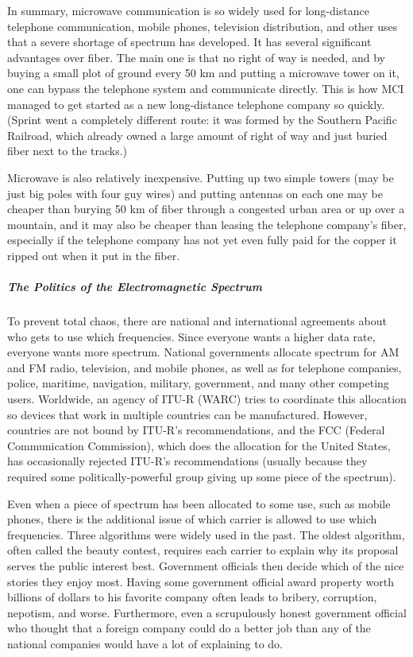 In summary, microwave communication is so widely used for long-distance
telephone communication, mobile phones, television distribution, and
other uses that a severe shortage of spectrum has developed. It has
several significant advantages over fiber. The main one is that no right
of way is needed, and by buying a small plot of ground every 50 km and
putting a microwave tower on it, one can bypass the telephone system and
communicate directly. This is how MCI managed to get started as a new
long-distance telephone company so quickly. (Sprint went a completely
different route: it was formed by the Southern Pacific Railroad, which
already owned a large amount of right of way and just buried fiber next
to the tracks.)

Microwave is also relatively inexpensive. Putting up two simple towers
(may be just big poles with four guy wires) and putting antennas on each
one may be cheaper than burying 50 km of fiber through a congested urban
area or up over a mountain, and it may also be cheaper than leasing the
telephone company's fiber, especially if the telephone company has not
yet even fully paid for the copper it ripped out when it put in the
fiber.

\protect\hypertarget{0130661023_ch02lev1sec3.htmlux5cux23ch02lev3sec5}{}{}

\subparagraph{The Politics of the Electromagnetic Spectrum}

To prevent total chaos, there are national and international agreements
about who gets to use which frequencies. Since everyone wants a higher
data rate, everyone wants more spectrum. National governments allocate
spectrum for AM and FM radio, television, and mobile phones, as well as
for telephone companies, police, maritime, navigation, military,
government, and many other competing users. Worldwide, an agency of
ITU-R (WARC) tries to coordinate this allocation so devices that work in
multiple countries can be manufactured. However, countries are not bound
by ITU-R's recommendations, and the FCC (Federal Communication
Commission), which does the allocation for the United States, has
occasionally rejected ITU-R's recommendations (usually because they
required some politically-powerful group giving up some piece of the
spectrum).

Even when a piece of spectrum has been allocated to some use, such as
mobile phones, there is the additional issue of which carrier is allowed
to use which frequencies. Three algorithms were widely used in the past.
The oldest algorithm, often called the {beauty contest}, requires each
carrier to explain why its proposal serves the public interest best.
Government officials then decide which of the nice stories they enjoy
most. Having some government official award property worth billions of
dollars to his favorite company often leads to bribery, corruption,
nepotism, and worse. Furthermore, even a scrupulously honest government
official who thought that a foreign company could do a better job than
any of the national companies would have a lot of explaining to do.

